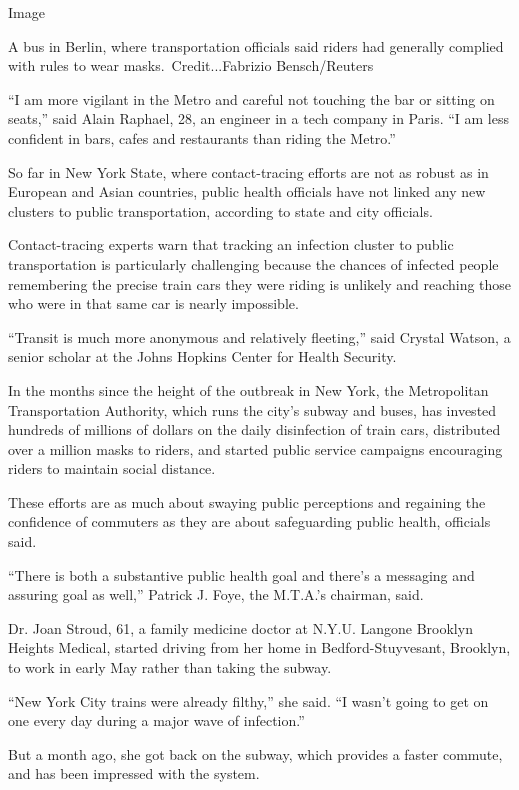 Image

A bus in Berlin, where transportation officials said riders had
generally complied with rules to wear masks.~Credit...Fabrizio
Bensch/Reuters

``I am more vigilant in the Metro and careful not touching the bar or
sitting on seats,'' said Alain Raphael, 28, an engineer in a tech
company in Paris. ``I am less confident in bars, cafes and restaurants
than riding the Metro.''

So far in New York State, where contact-tracing efforts are not as
robust as in European and Asian countries, public health officials have
not linked any new clusters to public transportation, according to state
and city officials.

Contact-tracing experts warn that tracking an infection cluster to
public transportation is particularly challenging because the chances of
infected people remembering the precise train cars they were riding is
unlikely and reaching those who were in that same car is nearly
impossible.

``Transit is much more anonymous and relatively fleeting,'' said Crystal
Watson, a senior scholar at the Johns Hopkins Center for Health
Security.

In the months since the height of the outbreak in New York, the
Metropolitan Transportation Authority, which runs the city's subway and
buses, has invested hundreds of millions of dollars on the daily
disinfection of train cars, distributed over a million masks to riders,
and started public service campaigns encouraging riders to maintain
social distance.

These efforts are as much about swaying public perceptions and regaining
the confidence of commuters as they are about safeguarding public
health, officials said.

``There is both a substantive public health goal and there's a messaging
and assuring goal as well,'' Patrick J. Foye, the M.T.A.'s chairman,
said.

Dr. Joan Stroud, 61, a family medicine doctor at N.Y.U. Langone Brooklyn
Heights Medical, started driving from her home in Bedford-Stuyvesant,
Brooklyn, to work in early May rather than taking the subway.

``New York City trains were already filthy,'' she said. ``I wasn't going
to get on one every day during a major wave of infection.''

But a month ago, she got back on the subway, which provides a faster
commute, and has been impressed with the system.

